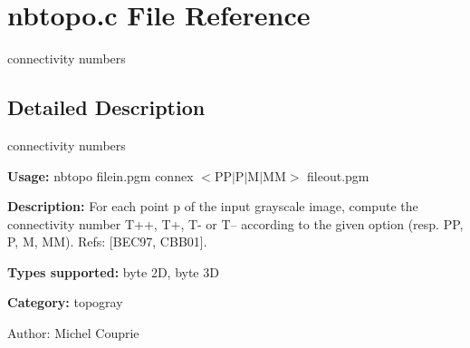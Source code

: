 \section{nbtopo.c File Reference}
\label{nbtopo_8c}
connectivity numbers  




\label{_details}
\subsection{Detailed Description}
connectivity numbers 

{\bf Usage:} nbtopo filein.pgm connex $<$PP$|$P$|$M$|$MM$>$ fileout.pgm

{\bf Description:} For each point p of the input grayscale image, compute the connectivity number T++, T+, T- or T-- according to the given option (resp. PP, P, M, MM). Refs: [BEC97, CBB01].

{\bf Types supported:} byte 2D, byte 3D

{\bf Category:} topogray

\begin{Desc}
\item[Author:]Michel Couprie \end{Desc}
